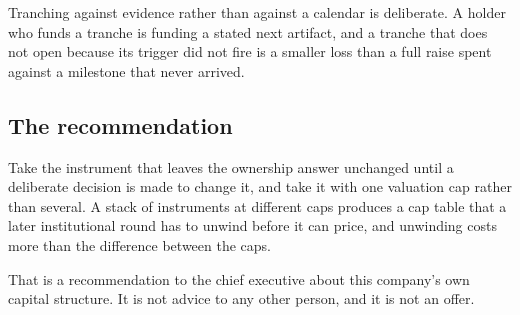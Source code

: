 Tranching against evidence rather than against a calendar is deliberate. A holder
who funds a tranche is funding a stated next artifact, and a tranche that does not
open because its trigger did not fire is a smaller loss than a full raise spent
against a milestone that never arrived.

\subsection{The recommendation}

Take the instrument that leaves the ownership answer unchanged until a deliberate
decision is made to change it, and take it with one valuation cap rather than
several. A stack of instruments at different caps produces a cap table that a
later institutional round has to unwind before it can price, and unwinding costs
more than the difference between the caps.

That is a recommendation to the chief executive about this company's own capital
structure. It is not advice to any other person, and it is not an offer.
